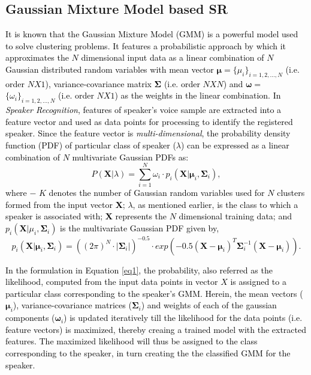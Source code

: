 \documentclass{article}
\begin{document}
\subsection{Gaussian Mixture Model based SR} 
\textcolor{black}{It is known that the Gaussian Mixture Model (GMM) is a 
powerful model used to solve clustering problems.  
It features a probabilistic approach by which it approximates the $N$ dimensional input data as a linear combination of $N$ Gaussian distributed random variables %
with mean vector $\bm \mu$$=$$\{\mu_i\}_{i=1,2,\ldots,N}$ (i.e. order $N$$X$$1$), variance-covariance \textcolor{black}{matrix} %
${\bm\Sigma}$ (i.e. order $N$$X$$N$) and $\bm \omega$$=$$\{\omega_i\}_{i=1,2,\ldots,N}$ (i.e. order $N$$X$$1$) as the weights in the linear combination.} \textcolor{black}{In 
\textit{Speaker Recognition}, features of speaker's voice sample 
are extracted into a feature vector and used as data points for processing to identify the registered speaker. %
Since the feature vector is \textit{multi-dimensional}, %
the probability density function (PDF) 
of particular class of speaker ($\lambda$) can be expressed as a linear combination of $N$ multivariate Gaussian PDFs as:
\begin{equation}
P(\bm X\vert\lambda) = \sum\limits_{i=1}^N \omega_i \cdot p_i(\bm X|\bm \mu_i,\bm \Sigma_i),
\label{eq1}
\end{equation}
where $-$ $K$ denotes the number of Gaussian random variables used for $N$ clusters formed from the input vector $\bm X$; \textbf{$\lambda$}, as mentioned earlier, is the class to which a speaker is associated with; $\bm X$ represents the $N$ dimensional training data; and $p_i(\bm X|\mu_i,\bm\Sigma_i)$ is the multivariate Gaussian PDF given by,%
\begin{equation}
p_i(\bm X|\bm \mu_i,\bm\Sigma_i) = \left({{(2\pi)^N\cdot |\bm\Sigma_i|}}\right)^{-0.5}\cdot exp\left({-0.5 (\bm X-\bm\mu_i)^T\bm\Sigma_i^{-1}(\bm X- \bm \mu_i)}\right).
\end{equation}
}

\textcolor{black}{In the formulation in Equation \ref{eq1}, the probability, also referred as the likelihood, computed from the input data points in vector $X$ is assigned to a particular class corresponding to the speaker's GMM. Herein, the mean vectors ($\bm \mu_i$), variance-covariance matrices ($\bm\Sigma_i$) and weights of each of the gaussian components ($\bm \omega_i$) is updated iteratively till the likelihood for the data points (i.e. feature vectors) is maximized, %
thereby creaing a trained model with the extracted features. The maximized likelihood will thus be assigned to the class corresponding to the speaker, in turn creating the the classified GMM for the speaker.} 
\end{document}
